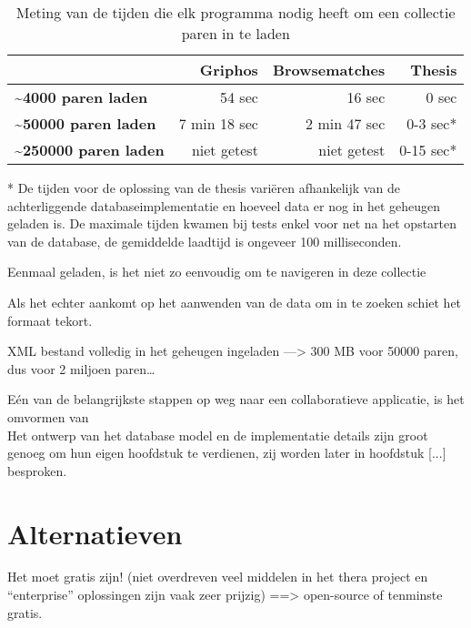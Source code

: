\begin{table}[h]
	\begin{center}
		\begin{tabular}{|l|r|r|r|}
		    \rowcolor{gray!75}
		    \hline
		    & \textbf{Griphos} &  \textbf{Browsematches} & \textbf{Thesis} \\
		    \hline
		    \textbf{\textasciitilde 4000 paren laden} & 54 sec & 16 sec & 0 sec \\
		    \textbf{\textasciitilde 50000 paren laden} & 7 min 18 sec & 2 min 47 sec  & 0-3 sec* \\
		    \textbf{\textasciitilde 250000 paren laden} & niet getest & niet getest & 0-15 sec* \\
		    \hline
		\end{tabular}
	\end{center}
	\caption{Meting van de tijden die elk programma nodig heeft om een collectie paren in te laden}
	\label{table:matchesloadspeed}
\end{table}

* De tijden voor de oplossing van de thesis vari\"eren afhankelijk van de achterliggende databaseimplementatie en hoeveel data er nog in het geheugen geladen is. De maximale tijden kwamen bij tests enkel voor net na het opstarten van de database, de gemiddelde laadtijd is ongeveer 100 milliseconden.

Eenmaal geladen, is het niet zo eenvoudig om te navigeren in deze collectie

Als het echter aankomt op het aanwenden van de data om in te zoeken schiet het formaat tekort.



XML bestand volledig in het geheugen ingeladen ---> 300 MB voor 50000 paren, dus voor 2 miljoen paren\ldots

E\'en van de belangrijkste stappen op weg naar een collaboratieve applicatie, is het omvormen van\\

Het ontwerp van het database model en de implementatie details zijn groot genoeg om hun eigen hoofdstuk te verdienen, zij worden later in hoofdstuk [...] besproken.\\

\section{Alternatieven}
Het moet gratis zijn! (niet overdreven veel middelen in het thera project en ``enterprise'' oplossingen zijn vaak zeer prijzig) ==> open-source of tenminste gratis.

